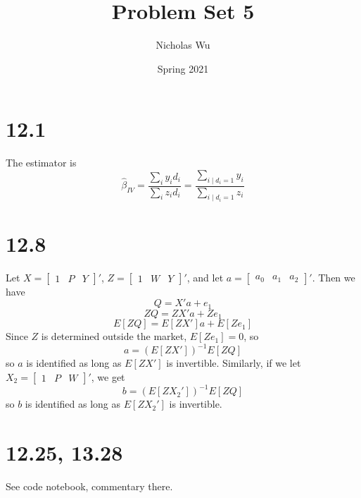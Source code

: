 \documentclass[10pt,letter]{article}
\begin{document}


\title{Problem Set 5}

\author{Nicholas Wu}

\date{Spring 2021}

\maketitle


\section*{12.1}
The estimator is
\[ \hat{\beta}_{IV} = \frac{\sum_i y_i d_i}{\sum_i z_i d_i} = \frac{\sum_{i \mid d_i = 1} y_i }{\sum_{i \mid d_i = 1} z_i} \]
\section*{12.8}
Let $X = \begin{bmatrix} 1 & P & Y \end{bmatrix}'$, $Z = \begin{bmatrix} 1 & W & Y \end{bmatrix}'$, and let $a = \begin{bmatrix} a_0 & a_1 & a_2 \end{bmatrix}'$. Then we have
\[Q = X'a + e_1 \]
\[ ZQ = ZX'a + Ze_1 \]
\[ E[ZQ] = E[ZX']a + E[Ze_1] \]
Since $Z$ is determined outside the market, $E[Ze_1] = 0$, so
\[ a = (E[ZX'])^{-1}E[ZQ] \]
so $a$ is identified as long as $E[ZX']$ is invertible. Similarly, if we let $X_2 = \begin{bmatrix} 1 & P & W \end{bmatrix}'$, we get
\[ b = (E[ZX_2'])^{-1}E[ZQ] \]
so $b$ is identified as long as $E[ZX_2']$ is invertible.
\section*{12.25, 13.28}
See code notebook, commentary there.
\end{document}
